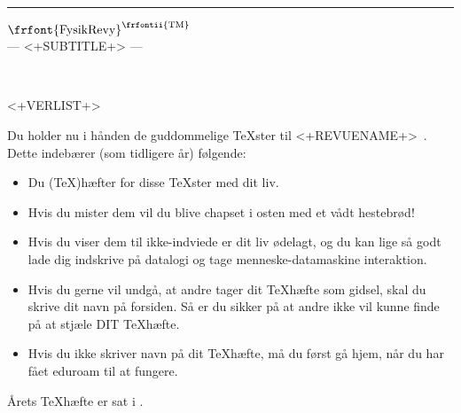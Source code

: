 \documentclass[11pt]{article}
\begin{document}
\thispagestyle{empty}

\begin{flushright}
	{\tiny <+TOPQUOTE+>}
\end{flushright}
\hrule
\begin{center}
{\frfont $\textrm{\frfont{FysikRevy}}^{\textrm{\frfontii{{TM}}}}$}
\\ {\frfontii --- <+SUBTITLE+> ---}
\vspace{2cm}

{}\\ %
\vspace{5mm}
{\cmfnttt{\today}}
%
\end{center}
\begin{footnotesize}
  \begin{sffamily}
    \begin{inparaitem}[\hspace{-0.26em},]
      <+VERLIST+>
    \end{inparaitem}
  \end{sffamily}
\end{footnotesize}
\vspace{1cm}


\begin{center}

\Large
Du holder nu i hånden de guddommelige \TeX ster til <+REVUENAME+>\ <+REVUEYEAR+>. Dette indebærer (som tidligere år) følgende:
\begin{itemize}
\item Du (\TeX)hæfter for disse \TeX ster med dit liv.
\item Hvis du mister dem vil du blive chapset i osten med et vådt hestebrød!
\item Hvis du viser dem til ikke-indviede er dit liv ødelagt, og du kan lige så 
godt lade dig indskrive på datalogi og tage menneske-datamaskine interaktion.
\item Hvis du gerne vil undgå, at andre tager dit \TeX hæfte som gidsel,
skal du skrive dit navn på forsiden. Så er du sikker på at andre ikke vil kunne
finde på at stjæle DIT \TeX hæfte. 
\item Hvis du ikke skriver navn på dit \TeX hæfte, må du først gå hjem, når du har fået eduroam til at fungere.
\end{itemize}
\end{center}
\vfill



\vfill
Årets \TeX hæfte er sat i \LaTeXe.
\begin{center}
	{\tiny <+BOTTOMQUOTE+>}
\end{center}
\end{document}
